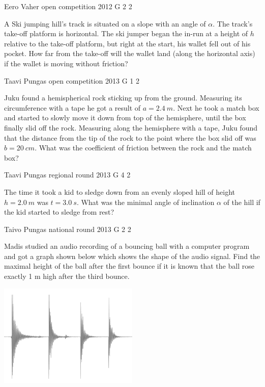 \documentclass[11pt]{article}
\begin{document}
{Eero Vaher} %
{open competition} %
{2012} %
{G 2} %
{2} %
{

\ifEngStatement
A Ski jumping hill’s track is situated on a slope with an angle of $\alpha$. The track’s take-off platform is horizontal. The ski jumper began the in-run at a height of $h$ relative to the take-off platform, but right at the start, his wallet fell out of his pocket. How far from the take-off will the wallet land (along the horizontal axis) if the wallet is moving without friction?
\fi
}

{Taavi Pungas} %
{open competition} %
{2013} %
{G 1} %
{2} %
{

\ifEngStatement
Juku found a hemispherical rock sticking up from the ground. Measuring its circumference with a tape he got a result of $a=\SI{2,4}{m}$. Next he took a match box and started to slowly move it down from top of the hemisphere, until the box finally slid off the rock. Measuring along the hemisphere with a tape, Juku found that the distance from the tip of the rock to the point where the box slid off was $b=\SI{20}{cm}$. What was the coefficient of friction between the rock and the match box?
\fi
}

{Taavi Pungas} %
{regional round} %
{2013} %
{G 4} %
{2} %
{

\ifEngStatement
The time it took a kid to sledge down from an evenly sloped hill of height $h=\SI{2,0}{m}$ was $t=\SI{3,0}{s}$. What was the minimal angle of inclination $\alpha$ of the hill if the kid started to sledge from rest?
\fi
}

{Taivo Pungas} %
{national round} %
{2013} %
{G 2} %
{2} %
{

\ifEngStatement
Madis studied an audio recording of a bouncing ball with a computer program and got a graph shown below which shows the shape of the audio signal. Find the maximal height of the ball after the first bounce if it is known that the ball rose exactly 1 m high after the third bounce.
\begin{center}
\includegraphics[width=0.5\textwidth]{2013-v3g-02-pall}%
\end{center}
\fi
}
\end{document}
